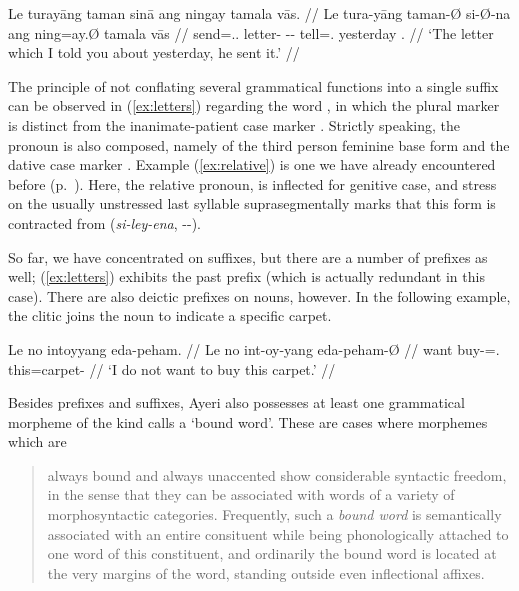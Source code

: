 \a\label{ex:relative}\begingl
	\gla Le turayāng taman sinā ang ningay tamala vās. //
	\glb Le tura-yāng taman-Ø si-Ø-na ang ning=ay.Ø tamala vās //
	\glc \PatTI{} send=\Tsg{}.\M{}.\Aarg{} letter-\Top{} 
		\Rel{}-\PatTI{}-\Gen{} \AgtT{} tell=\Fsg{}.\Top{} yesterday 
		\Ssg{}.\Parg{} //
	\glft `The letter which I told you about yesterday, he sent it.' //
\endgl
\xe

The principle of not conflating several grammatical functions into a single 
suffix can be observed in (\ref{ex:letters}) regarding the word 
, in which the plural marker 
 is distinct from the inanimate-patient case marker 
. Strictly speaking, the pronoun  
is also composed, namely of the third person feminine base form  
and the dative case marker . Example (\ref{ex:relative}) is one 
we have already encountered before (p.~\pageref{doublerel}). Here, the relative 
pronoun,  is inflected for genitive case, and 
stress on the usually unstressed last syllable 
suprasegmentally marks that this form is contracted from 
 (\textit{si-ley-ena}, \Rel{}-\PargI{}-\Gen{}).

So far, we have concentrated on suffixes, but there are a number of 
prefixes as well; (\ref{ex:letters}) exhibits the past prefix 
 (which is actually redundant in this case). There are also 
deictic prefixes on nouns, however. In the following example, the clitic 
 joins the noun  to indicate a 
specific carpet.

\ex\begingl
	\gla Le no intoyyang eda-peham. //
	\glb Le no int-oy-yang eda-peham-Ø //
	\glc \PatTI{} want buy-\Neg{}=\Fsg{}.\Aarg{} this=carpet-\Top{} //
	\glft `I do not want to buy this carpet.' //
\endgl\xe

Besides prefixes and suffixes, Ayeri also possesses at least one grammatical 
morpheme of the kind \citet{zwicky1977} calls a `bound word'. These are cases where morphemes which are

\blockcquote[6]{zwicky1977}{always bound and always unaccented show considerable 
syntactic freedom, in the sense that they can be associated with words of a 
variety of morphosyntactic categories. Frequently, such a \emph{bound word} is 
semantically associated with an entire consituent while being phonologically 
attached to one word of this constituent, and ordinarily the bound word is 
located at the very margins of the word, standing outside even inflectional 
affixes.}

